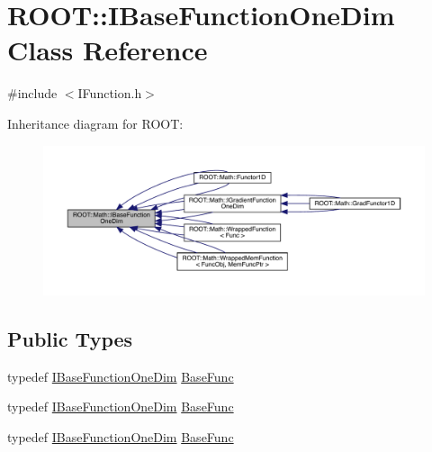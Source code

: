 \hypertarget{classROOT_1_1Math_1_1IBaseFunctionOneDim}{}\section{R\+O\+OT\+:\+:I\+Base\+Function\+One\+Dim Class Reference}
\label{classROOT_1_1Math_1_1IBaseFunctionOneDim}


{\ttfamily \#include $<$I\+Function.\+h$>$}



Inheritance diagram for R\+O\+OT\+:
\nopagebreak
\begin{figure}[H]
\begin{center}
\leavevmode
\includegraphics[width=350pt]{d9/de3/classROOT_1_1Math_1_1IBaseFunctionOneDim__inherit__graph}
\end{center}
\end{figure}
\subsection*{Public Types}
\begin{DoxyCompactItemize}
\item 
typedef \mbox{\hyperlink{classROOT_1_1Math_1_1IBaseFunctionOneDim}{I\+Base\+Function\+One\+Dim}} \mbox{\hyperlink{classROOT_1_1Math_1_1IBaseFunctionOneDim_a87fee465cea6b03c55aa6bc1cf641cc9}{Base\+Func}}
\item 
typedef \mbox{\hyperlink{classROOT_1_1Math_1_1IBaseFunctionOneDim}{I\+Base\+Function\+One\+Dim}} \mbox{\hyperlink{classROOT_1_1Math_1_1IBaseFunctionOneDim_a87fee465cea6b03c55aa6bc1cf641cc9}{Base\+Func}}
\item 
typedef \mbox{\hyperlink{classROOT_1_1Math_1_1IBaseFunctionOneDim}{I\+Base\+Function\+One\+Dim}} \mbox{\hyperlink{classROOT_1_1Math_1_1IBaseFunctionOneDim_a87fee465cea6b03c55aa6bc1cf641cc9}{Base\+Func}}
\end{DoxyCompactItemize}
